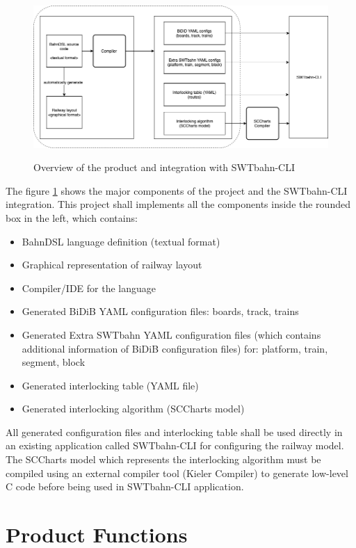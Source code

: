 \documentclass[a4paper,11pt]{scrreprt}
\begin{document}
\begin{figure}[h!]
	\centering
		\includegraphics[width=390pt]{diagrams/bahndsl-overview.png}
    \label{fig:overview}
    \caption{Overview of the product and integration with SWTbahn-CLI}
\end{figure}

The figure \ref{fig:overview} shows the major components of the project and the SWTbahn-CLI integration. This project shall implements all the components inside the rounded box in the left, which contains:
\begin{itemize}
    \item BahnDSL language definition (textual format)
    \item Graphical representation of railway layout
    \item Compiler/IDE for the language
    \item Generated BiDiB YAML configuration files: boards, track, trains
    \item Generated Extra SWTbahn YAML configuration files (which contains additional information of BiDiB configuration files) for: platform, train, segment, block
    \item Generated interlocking table (YAML file)
    \item Generated interlocking algorithm (SCCharts model)
\end{itemize}

All generated configuration files and interlocking table shall be used directly in an existing application called SWTbahn-CLI for configuring the railway model. The SCCharts model which represents the interlocking algorithm must be compiled using an external compiler tool (Kieler Compiler) to generate low-level C code before being used in SWTbahn-CLI application.

\section{Product Functions}
\end{document}
